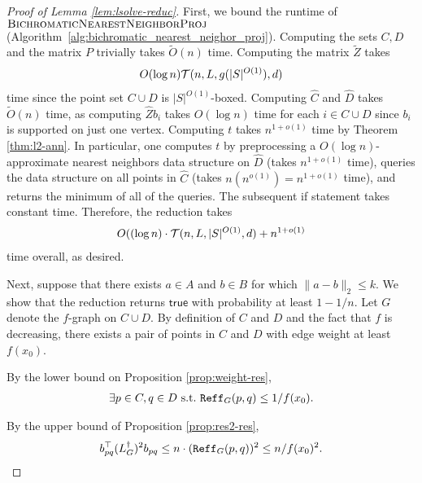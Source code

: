 \begin{proof}[Proof of Lemma \ref{lem:lsolve-reduc}]
First, we bound the runtime of $\textsc{BichromaticNearestNeighborProj}$ (Algorithm~\ref{alg:bichromatic_nearest_neighor_proj}). Computing the sets $C,D$ and the matrix $P$ trivially takes $\tilde{O}( n )$ time. Computing the matrix $\tilde{Z}$ takes 
\begin{align*}
O(\log n) \mathcal{T}(n,L,g(|S|^{O(1)}),d)
\end{align*}
time since the point set $C\cup D$ is $|S|^{O(1)}$-boxed. Computing $\widehat{C}$ and $\widehat{D}$ takes $\tilde{O}( n )$ time, as computing $\widehat{Z}b_i$ takes $O(\log n)$ time for each $i\in C\cup D$ since $b_i$ is supported on just one vertex. Computing $t$ takes $n^{1 + o(1)}$ time by Theorem \ref{thm:l2-ann}. In particular, one computes $t$ by preprocessing a $O(\log n)$-approximate nearest neighbors data structure on $\widehat{D}$ (takes $n^{1+o(1)}$ time), queries the data structure on all points in $\widehat{C}$ (takes $n (n^{o(1)}) = n^{1+o(1)}$ time), and returns the minimum of all of the queries. The subsequent if statement takes constant time. Therefore, the reduction takes \begin{align*}
O((\log n) \cdot \mathcal{T}(n,L,|S|^{O(1)},d) + n^{1 + o(1)}
\end{align*}
time overall, as desired.

Next, suppose that there exists $a\in A$ and $b\in B$ for which $\| a - b \|_2 \le k$. We show that the reduction returns $\mathsf{true}$ with probability at least $1 - 1/n$. Let $G$ denote the $f$-graph on $C\cup D$. By definition of $C$ and $D$ and the fact that $f$ is decreasing, there exists a pair of points in $C$ and $D$ with edge weight at least $f(x_0)$. 

By the lower bound on Proposition \ref{prop:weight-res}, 
\begin{align*}
\exists
p\in C,q\in D \text{~s.t.~} \mathtt{Reff}_G(p,q)\le 1/f(x_0).
\end{align*}

By the upper bound of Proposition \ref{prop:res2-res}, 
\begin{align*}
b_{pq}^\top  (L_G^{\dagger})^2 b_{pq} \le n \cdot (\mathtt{Reff}_G(p,q))^2 \le n/f(x_0)^2 .
\end{align*}


\end{proof}
